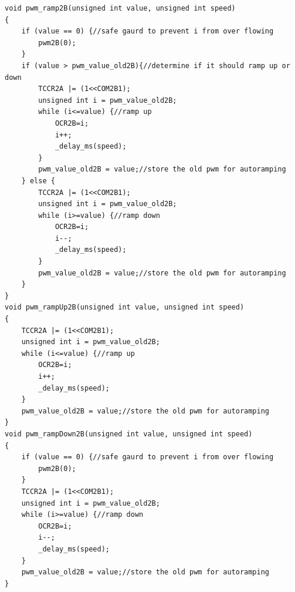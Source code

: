 \documentclass{article}
\begin{document}
\begin{lstlisting}[caption={The PWM function library.},label=pwm,frame=tbl]
void pwm_ramp2B(unsigned int value, unsigned int speed)
{
    if (value == 0) {//safe gaurd to prevent i from over flowing
        pwm2B(0);
    }
    if (value > pwm_value_old2B){//determine if it should ramp up or down
        TCCR2A |= (1<<COM2B1);
        unsigned int i = pwm_value_old2B;
        while (i<=value) {//ramp up
            OCR2B=i;
            i++;
            _delay_ms(speed);
        }
        pwm_value_old2B = value;//store the old pwm for autoramping
    } else {
        TCCR2A |= (1<<COM2B1);
        unsigned int i = pwm_value_old2B;
        while (i>=value) {//ramp down
            OCR2B=i;
            i--;
            _delay_ms(speed);
        }
        pwm_value_old2B = value;//store the old pwm for autoramping
    }
}
void pwm_rampUp2B(unsigned int value, unsigned int speed)
{
    TCCR2A |= (1<<COM2B1);
    unsigned int i = pwm_value_old2B;
    while (i<=value) {//ramp up
        OCR2B=i;
        i++;
        _delay_ms(speed);
    }
    pwm_value_old2B = value;//store the old pwm for autoramping
}
void pwm_rampDown2B(unsigned int value, unsigned int speed)
{
    if (value == 0) {//safe gaurd to prevent i from over flowing
        pwm2B(0);
    }
    TCCR2A |= (1<<COM2B1);
    unsigned int i = pwm_value_old2B;
    while (i>=value) {//ramp down
        OCR2B=i;
        i--;
        _delay_ms(speed);
    }
    pwm_value_old2B = value;//store the old pwm for autoramping
}

\end{lstlisting}
\end{document}
